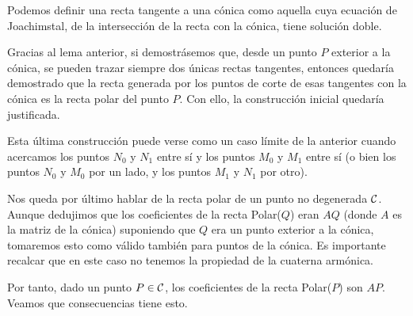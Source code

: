 \begin{obs}
	Podemos definir una recta tangente a una cónica como aquella cuya ecuación de Joachimstal, de la intersección de la recta con la cónica, tiene solución doble.
\end{obs}

Gracias al lema anterior, si demostrásemos que, desde un punto $P$ exterior a la cónica, se pueden trazar siempre dos únicas rectas tangentes, entonces quedaría demostrado que la recta generada por los puntos de corte de esas tangentes con la cónica es la recta polar del punto $P$. Con ello, la construcción inicial quedaría justificada.
\begin{obs}
	Esta última construcción puede verse como un caso límite de la anterior cuando acercamos los puntos $N_0$ y $N_1$ entre sí y los puntos $M_0$ y $M_1$ entre sí (o bien los puntos $N_0$ y $M_0$ por un lado, y los puntos $M_1$ y $N_1$ por otro).
\end{obs}

Nos queda por último hablar de la recta polar de un punto  no degenerada $\mathcal{C}$. Aunque dedujimos que los coeficientes de la recta Polar($Q$) eran $AQ$ (donde $A$ es la matriz de la cónica) suponiendo que $Q$ era un punto exterior a la cónica, tomaremos esto como válido también para puntos de la cónica. Es importante recalcar que en este caso no tenemos la propiedad de la cuaterna armónica.

Por tanto, dado un punto $P\in \mathcal{C}$, los coeficientes de la recta Polar($P$) son $AP$. Veamos que consecuencias tiene esto.


